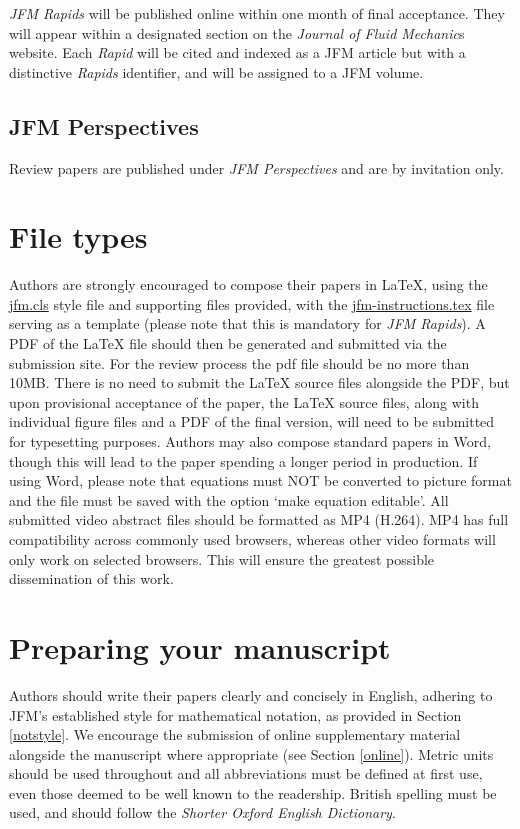 \documentclass[lineno]{jfm}
\begin{document}
{\it JFM Rapids} will be published online within one month of final acceptance.  They will appear within a designated section on the {\it Journal of Fluid Mechanic}s website.  Each {\it Rapid} will be cited and indexed as a JFM article but with a distinctive {\it Rapids} identifier, and will be assigned to a JFM volume.

\subsection{JFM Perspectives}
 Review papers are published under {\it JFM Perspectives } and are by invitation only.

\section{File types}\label{sec:filetypes}
 Authors are strongly encouraged to compose their papers in {\LaTeX}, using the \href{https://www.cambridge.org/core/journals/journal-of-fluid-mechanics/information/instructions-contributors} {jfm.cls} style file and supporting files provided, with the \href{https://www.cambridge.org/core/journals/journal-of-fluid-mechanics/information/instructions-contributors} {jfm-instructions.tex} file serving as a template (please note that this is mandatory for {\it JFM Rapids}). A PDF of the {\LaTeX} file should then be generated and submitted via the submission site. For the review process the pdf file should be no more than 10MB. There is no need to submit the {\LaTeX} source files alongside the PDF, but upon provisional acceptance of the paper, the {\LaTeX} source files, along with individual figure files and a PDF of the final version, will need to be submitted for typesetting purposes.
Authors may also compose standard papers in Word, though this will lead to the paper spending a longer period in production. If using Word, please note that equations must NOT be converted to picture format and the file must be saved with the option `make equation editable'. All submitted video abstract files should be formatted as MP4 (H.264). MP4 has full compatibility across commonly used browsers, whereas other video formats will only work on selected browsers. This will ensure the greatest possible dissemination of this work.
\section{Preparing your manuscript}
 Authors should write their papers clearly and concisely in English, adhering to JFM's established style for mathematical notation, as provided in Section \ref{notstyle}. We encourage the submission of online supplementary material alongside the manuscript where appropriate (see Section \ref{online}). Metric units should be used throughout and all abbreviations must be defined at first use, even those deemed to be well known to the readership. British spelling must be used, and should follow the \textit{Shorter Oxford English Dictionary}.
\end{document}
